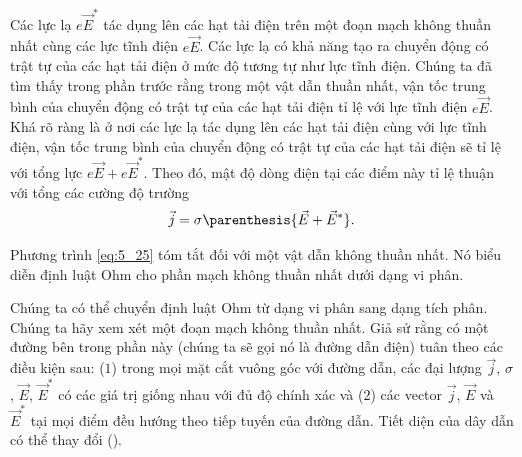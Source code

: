 Các lực lạ $e\vec{E}^*$ tác dụng lên các hạt tải điện trên một đoạn mạch không thuần nhất cùng các lực tĩnh điện $e\vec{E}$. Các lực lạ có khả năng tạo ra chuyển động có trật tự của các hạt tải điện ở mức độ tương tự như lực tĩnh điện. Chúng ta đã tìm thấy trong phần trước rằng trong một vật dẫn thuần nhất, vận tốc trung bình của chuyển động có trật tự của các hạt tải điện tỉ lệ với lực tĩnh điện $e\vec{E}$. Khá rõ ràng là ở nơi các lực lạ tác dụng lên các hạt tải điện cùng với lực tĩnh điện, vận tốc trung bình của chuyển động có trật tự của các hạt tải điện sẽ tỉ lệ với tổng lực $e\vec{E}+ e\vec{E}^*$. Theo đó, mật độ dòng điện tại các điểm này tỉ lệ thuận với tổng các cường độ trường
\begin{equation}\label{eq:5_25}
    \vec{j} = \sigma \parenthesis{\vec{E}+\vec{E}^*}.
\end{equation}

Phương trình \eqref{eq:5_25} tóm tắt  đối với một vật dẫn không thuần nhất. Nó biểu diễn định luật Ohm cho phần mạch không thuần nhất dưới dạng vi phân.

Chúng ta có thể chuyển định luật Ohm từ dạng vi phân sang dạng tích phân. Chúng ta hãy xem xét một đoạn mạch không thuần nhất. Giả sử rằng có một đường bên trong phần này (chúng ta sẽ gọi nó là đường dẫn điện) tuân theo các điều kiện sau: ($1$) trong mọi mặt cắt vuông góc với đường dẫn, các đại lượng $\vec{j}$, $\sigma$, $\vec{E}$, $\vec{E}^*$ có các giá trị giống nhau với đủ độ chính xác và ($2$) các vector $\vec{j}$, $\vec{E}$ và $\vec{E}^*$ tại mọi điểm đều hướng theo tiếp tuyến của đường dẫn. Tiết diện của dây dẫn có thể thay đổi ().

